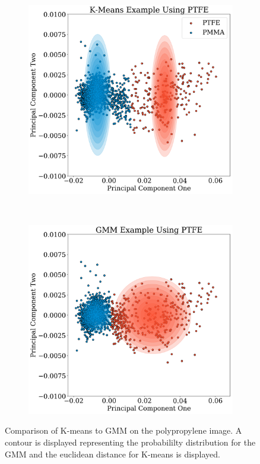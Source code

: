 \documentclass[a4paper,11pt]{article}
\begin{document}
\begin{figure}[t!]
    \centering
    \begin{subfigure}[b]{0.48\textwidth}
        \includegraphics[width=\textwidth]{figures/Kmeans.png}
    \end{subfigure}
    ~ %
    \begin{subfigure}[b]{0.48\textwidth}
        \includegraphics[width=\textwidth]{figures/GMM.png}
    \end{subfigure}

    \caption{Comparison of K-means to GMM on the polypropylene image. A contour is displayed representing the probabililty distribution for the GMM and the euclidean distance for K-means is displayed.}
    \label{clustering_methods}
\end{figure}
\end{document}
